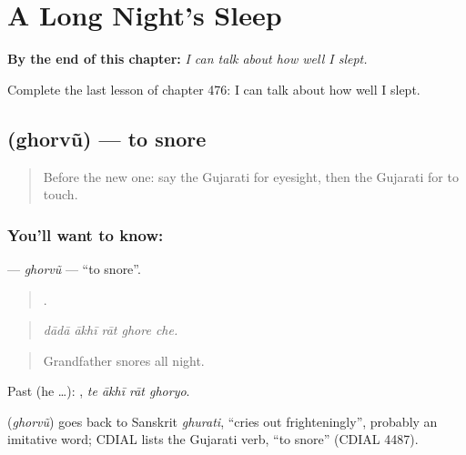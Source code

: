 
\chapter{A Long Night's Sleep}
\label{ch:gu-a-long-night-s-sleep}

\begin{chapteropening}
\textbf{By the end of this chapter:} \emph{I can talk about how well I slept.}

Complete the last lesson of chapter 476: I can talk about how well I slept.
\end{chapteropening}

\section[\texorpdfstring{\gu{ઘોરવું} (ghorvũ)}{ઘોરવું (ghorvũ)}]{ (ghorvũ) — to snore}

\label{lesson:GU-C476-ghorvu}



\begin{quote}
Before the new one: say the Gujarati for eyesight, then the Gujarati for to touch.
\end{quote}

\subsection*{You'll want to know: }
\textbf{} — \emph{ghorvũ} — \textquotedblleft{}to snore\textquotedblright{}.

\begin{quote}
    .
\end{quote}

\begin{quote}
\emph{dādā ākhī rāt ghore che.}
\end{quote}

\begin{quote}
Grandfather snores all night.
\end{quote}

Past (he …):    , \emph{te ākhī rāt ghoryo}.

\begin{cousinweb}
\textbf{} (\emph{ghorvũ}) goes back to Sanskrit \emph{ghurati}, \textquotedblleft{}cries out frighteningly\textquotedblright{}, probably an imitative word; CDIAL lists the Gujarati verb, \textquotedblleft{}to snore\textquotedblright{} (CDIAL 4487).
\end{cousinweb}

